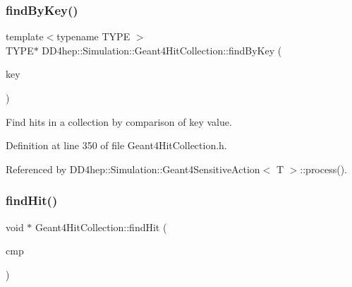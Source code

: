 \hypertarget{class_d_d4hep_1_1_simulation_1_1_geant4_hit_collection_a1e2bf3283a0d710932de88d883bba9a4}{}\label{class_d_d4hep_1_1_simulation_1_1_geant4_hit_collection_a1e2bf3283a0d710932de88d883bba9a4} 
\subsubsection{\texorpdfstring{find\+By\+Key()}{findByKey()}}
{\footnotesize\ttfamily template$<$typename T\+Y\+PE $>$ \\
T\+Y\+PE$\ast$ D\+D4hep\+::\+Simulation\+::\+Geant4\+Hit\+Collection\+::find\+By\+Key (\begin{DoxyParamCaption}\item[{Volume\+ID}]{key }\end{DoxyParamCaption})\hspace{0.3cm}{\ttfamily [inline]}}



Find hits in a collection by comparison of key value. 



Definition at line 350 of file Geant4\+Hit\+Collection.\+h.



Referenced by D\+D4hep\+::\+Simulation\+::\+Geant4\+Sensitive\+Action$<$ T $>$\+::process().

\hypertarget{class_d_d4hep_1_1_simulation_1_1_geant4_hit_collection_a4c854c0d590b4d453b2863933dfa31a1}{}\label{class_d_d4hep_1_1_simulation_1_1_geant4_hit_collection_a4c854c0d590b4d453b2863933dfa31a1} 
\subsubsection{\texorpdfstring{find\+Hit()}{findHit()}}
{\footnotesize\ttfamily void $\ast$ Geant4\+Hit\+Collection\+::find\+Hit (\begin{DoxyParamCaption}\item[{const \hyperlink{class_d_d4hep_1_1_simulation_1_1_geant4_hit_collection_1_1_compare}{Compare} \&}]{cmp }\end{DoxyParamCaption})\hspace{0.3cm}{\ttfamily [protected]}}



